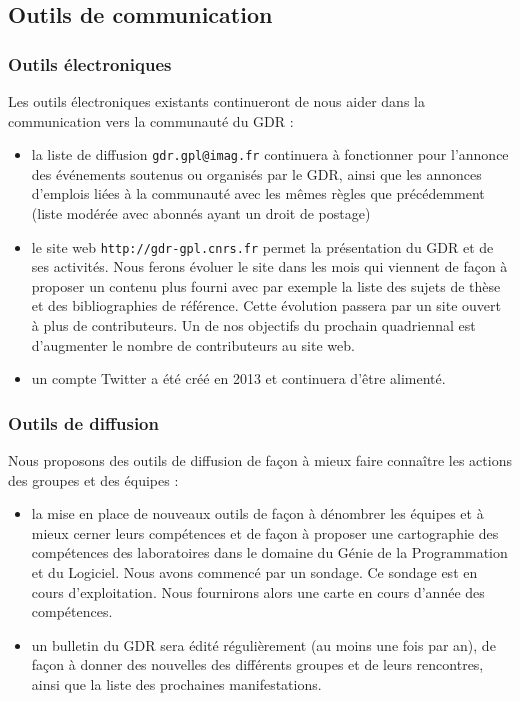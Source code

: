\documentclass[11pt]{article}
\begin{document}
\subsection{Outils de communication}

\subsubsection{Outils électroniques}

Les outils électroniques existants continueront de nous aider dans la communication vers la communauté du GDR :

\begin{itemize}
\item la liste de diffusion \texttt{gdr.gpl@imag.fr}  continuera à fonctionner
  pour l'annonce des événements soutenus ou organisés par le GDR, ainsi que les
  annonces d'emplois liées à la communauté avec les mêmes règles que
  précédemment (liste modérée avec abonnés ayant un droit de postage)

\item le site web  \texttt{http://gdr-gpl.cnrs.fr}  permet la présentation du
  GDR et de ses activités. Nous ferons évoluer le site dans les mois qui
  viennent de façon à proposer un contenu plus fourni avec par exemple la liste
  des sujets de thèse et des bibliographies de référence.
  Cette évolution passera par un site ouvert à plus de contributeurs.
  Un de nos objectifs du prochain quadriennal est d'augmenter le nombre de
  contributeurs au site web.

\item un compte Twitter a été créé en 2013 et continuera d'être alimenté.
\end{itemize}

\subsubsection{Outils de diffusion}

Nous proposons des outils de diffusion de façon à mieux faire connaître les
actions des groupes et des équipes :

\begin{itemize}
\item la mise en place de nouveaux outils de façon à dénombrer les équipes et à mieux cerner leurs compétences et de façon à proposer une cartographie des compétences des laboratoires dans le domaine du Génie de la Programmation et du Logiciel. Nous avons commencé par un sondage. Ce sondage est en cours d'exploitation. Nous fournirons alors une carte en cours d'année des compétences.
\item un bulletin du GDR sera édité régulièrement (au moins une fois par an), de façon à donner des nouvelles des différents groupes et de leurs rencontres, ainsi que la liste des prochaines manifestations.
\end{itemize}
\end{document}
